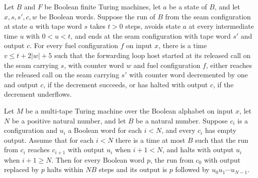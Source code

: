 \begin{lemma}
\label{Turing.FinTM.emLoopHost_round}
\leanok
{}
Let $B$ and $F$ be Boolean finite Turing machines, let $a$ be a state of $B$, and let
$x,s,s',c,w$ be Boolean words. Suppose the run of $B$ from the seam configuration at
state $a$ with tape word $s$ takes $t>0$ steps, avoids state $a$ at every intermediate
time $u$ with $0<u<t$, and ends at the seam configuration with tape word $s'$ and output
$c$. For every fuel configuration $f$ on input $x$, there is a time $v\le t+2|w|+5$ such
that the forwarding loop host started at its released call on the seam carrying $s$,
with counter word $w$ and fuel configuration $f$, either reaches the released call on
the seam carrying $s'$ with counter word decremented by one and output $c$, if the
decrement succeeds, or has halted with output $c$, if the decrement underflows.
\end{lemma}

\begin{lemma}
\label{Turing.FinTM.emLoop_sum}
\leanok
{}
Let $M$ be a multi-tape Turing machine over the Boolean alphabet on input $x$, let $N$
be a positive natural number, and let $B$ be a natural number. Suppose $c_i$ is a
configuration and $u_i$ a Boolean word for each $i<N$, and every $c_i$ has empty output.
Assume that for each $i<N$ there is a time at most $B$ such that the run from $c_i$
reaches $c_{i+1}$ with output $u_i$ when $i+1<N$, and halts with output $u_i$ when
$i+1\ge N$. Then for every Boolean word $p$, the run from $c_0$ with output replaced by
$p$ halts within $NB$ steps and its output is $p$ followed by $u_0u_1\cdots u_{N-1}$.
\end{lemma}

